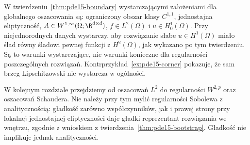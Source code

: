 W twierdzeniu~\ref{thm:pde15-boundary} wystarczającymi
założeniami dla globalnego oszacowania są: ograniczony
obszar klasy $C^{1,1}$, jednostajna eliptyczność,
$A\in W^{1,\infty}(\Omega;\R^{d\times d})$,
$f\in L^2(\Omega)$ i $u\in H_0^1(\Omega)$.
Przy niejednorodnych danych wystarczy, aby rozwiązanie
słabe $u\in H^1(\Omega)$ miało ślad równy śladowi
pewnej funkcji z $H^2(\Omega)$, jak wykazano po tym
twierdzeniu. Są to warunki wystarczające, nie warunki
konieczne dla regularności poszczególnych rozwiązań.
Kontrprzykład~\ref{ex:pde15-corner} pokazuje, że
sam brzeg Lipschitzowski nie wystarcza w ogólności.

W kolejnym rozdziale przejdziemy od oszacowań $L^2$ do
regularności $W^{2,p}$ oraz oszacowań Schaudera.
Nie należy przy tym mylić regularności Sobolewa z analitycznością:
gładkość zarówno współczynników, jak i prawej strony
przy lokalnej jednostajnej eliptyczności daje gładki
reprezentant rozwiązania we wnętrzu, zgodnie z wnioskiem
z twierdzenia~\ref{thm:pde15-bootstrap}. Gładkość
nie implikuje jednak analityczności.
